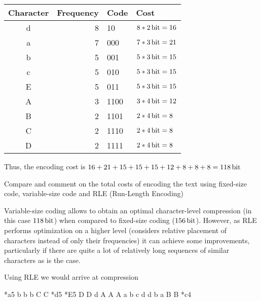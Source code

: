 {\begin{center} \begin{tabular}{c | r l l}
    \textbf{Character} & \textbf{Frequency} & \textbf{Code} & \textbf{Cost} \\ \hline
    d                  &                  8 & 10            & $8*\SI{2}{\bit}=16$ \\
    a                  &                  7 & 000           & $7*\SI{3}{\bit}=21$ \\
    b                  &                  5 & 001           & $5*\SI{3}{\bit}=15$ \\
    c                  &                  5 & 010           & $5*\SI{3}{\bit}=15$ \\
    E                  &                  5 & 011           & $5*\SI{3}{\bit}=15$ \\
    A                  &                  3 & 1100          & $3*\SI{4}{\bit}=12$ \\
    B                  &                  2 & 1101          & $2*\SI{4}{\bit}=8$ \\
    C                  &                  2 & 1110          & $2*\SI{4}{\bit}=8$ \\
    D                  &                  2 & 1111          & $2*\SI{4}{\bit}=8$ \\
\end{tabular} \end{center}

Thus, the encoding cost is $16+21+15+15+15+12+8+8+8 = \SI{118}{\bit}$

Compare and comment on the total costs of encoding the text using fixed-size code, variable-size code and RLE (Run-Length Encoding)

\ansseparator

Variable-size coding allows to obtain an optimal character-level compression (in this case $\SI{118}{\bit}$) when compared to fixed-size coding ($\SI{156}{\bit}$). However, as RLE performs optimization on a higher level (considers relative placement of characters instead of only their frequencies) it can achieve some improvements, particularly if there are quite a lot of relatively long sequences of similar characters as is the case.

Using RLE we would arrive at compression

\begin{center}
    *a5 b b b C C *d5 *E5 D D d A A A a b c d d b a B B *c4
\end{center}

}
